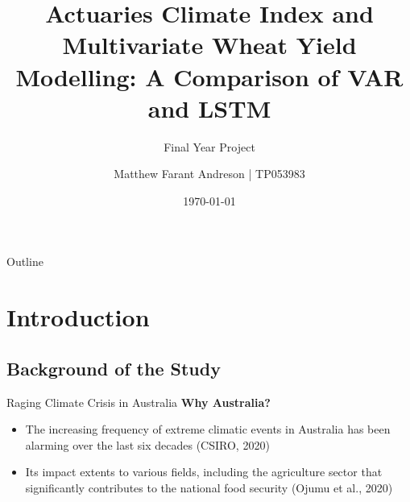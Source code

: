 \documentclass[aspectratio=169]{beamer}
\title{\textbf{Actuaries Climate Index and Multivariate Wheat Yield Modelling: A Comparison of VAR and LSTM}}
\subtitle{Final Year Project}
\author{Matthew Farant Andreson | TP053983}
\institute{Asia Pacific University of Technology and Innovation}
\date{\today}
\begin{document}

\AtBeginSection{\frame{\sectionpage}}

\begin{frame}
    \titlepage    
\end{frame}

\usebackgroundtemplate{}
\begin{frame}{Outline}
    \tableofcontents[hideallsubsections]
\end{frame}

\section{Introduction}
\subsection{Background of the Study}
\begin{frame}{Raging Climate Crisis in Australia}
\large{\textbf{Why Australia?}}
    \begin{itemize}
        \item The increasing frequency of extreme climatic events in Australia has been alarming over the last six decades (CSIRO, 2020)
        \item Its impact extents to various fields, including the agriculture sector that significantly contributes to the national food security (Ojumu et al., 2020)
    \end{itemize}
\end{frame}
\end{document}
